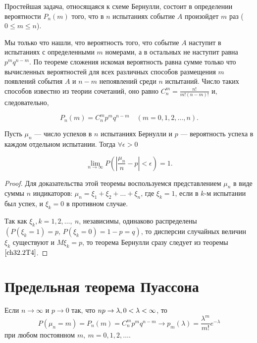 Простейшая задача, относящаяся к схеме Бернулли, состоит в определении вероятности $P_n(m)$ того, что в $n$ испытаниях событие $A$ произойдет $m$ раз ($0 \le m \le n$).

Мы только что нашли, что вероятность того, что событие $A$ наступит в испытаниях с определенными $m$ номерами, а в остальных не наступит равна $p^mq^{n - m}$. По теореме сложения искомая вероятность равна сумме только что вычисленных вероятностей для всех различных способов размещения $m$ появлений события $A$ и $n - m$ непоявлений среди $n$ испытаний. Число таких способов известно из теории сочетаний, оно равно 	$C_n^m = \frac{n!}{m!(n - m)!}$ и, следовательно,
 
\begin{equation} \label{ch32.1.1eq1}
P_n(m) = C_n^m p^mq^{n - m} \quad (m = 0,1,2,\ldots,n).
\end{equation}

\begin{thm} [Бернулли]
Пусть $\mu_n$ --- число успехов в $n$ испытаниях Бернулли и $p$ --- вероятность успеха в каждом отдельном испытании. Тогда $\forall \epsilon > 0$

\begin{equation} \label{ch32.2eq7}
\lim_{n \to \infty} P \left( \left| \frac{\mu_n}{n} - p \right| < \epsilon \right) = 1.
\end{equation}
\end{thm}

\begin{proof}
Для доказательства этой теоремы воспользуемся представлением $\mu_n$ в виде суммы $n$ индикаторов: $\mu_n = \xi_1 + \xi_2 + \ldots + \xi_n$, где $\xi_k = 1$, если в $k$-м испытании был успех, и $\xi_k  = 0$ в противном случае.

Так как $\xi_k, k = 1,2,\ldots, \: n$, независимы, одинаково распределены $(P( \xi_k = 1) = p, \,P( \xi_k = 0) = 1 - p = q)$, то дисперсии случайных величин $\xi_k$ существуют и $M  \xi_k = p$, то теорема Бернулли сразу следует из теоремы $\ref{ch32.2T4}$.
\end{proof}



\section{Предельная теорема Пуассона}
\begin{thm} [Пуассона]
Если $n \to \infty$ и $p \to 0$ так, что $np \to \lambda, \:\\ 0 < \lambda < \infty$, то
$$
P(\mu_n = m) = P_n(m) = C_n^m p^mq^{n - m} \to p_m(\lambda) = \frac{\lambda^m}{m!} e^{-\lambda}
$$
при любом постоянном $m, \: m = 0,1,2,\dots$.
\end{thm}


